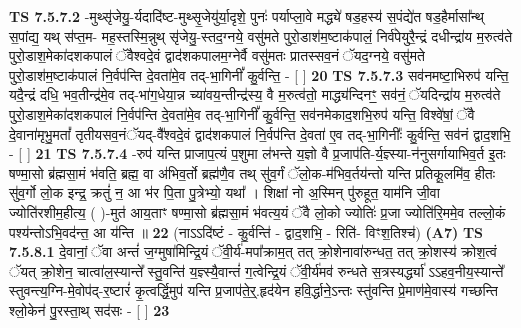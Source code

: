 \documentclass[17pt]{extarticle}
\begin{document}
                  \newline
                                \textbf{ TS 7.5.7.2} \newline
                  -मुथ्सृ॑जेयु॒-र्यदादि॑ष्ट-मुथ्सृ॒जेयु॑र्या॒दृशे॒ पुनः॑ पर्याप्ला॒वे मद्ध्ये॑ षड॒हस्य॑ स॒पंद्ये॑त षड॒हैर्मासा᳚न्थ् स॒पांद्य॒ यथ् स॑प्त॒म- मह॒स्तस्मि॒न्नुथ् सृ॑जेयु॒-स्तद॒ग्नये॒ वसु॑मते पुरो॒डाश॑म॒ष्टाक॑पालं॒ निर्व॑पेयुरै॒न्द्रं दधीन्द्रा॑य म॒रुत्व॑ते पुरो॒डाश॒मेका॑दशकपालं ॅवैश्वदे॒वं द्वाद॑शकपालम॒ग्नेर्वै वसु॑मतः प्रातस्सव॒नं ॅयद॒ग्नये॒ वसु॑मते पुरो॒डाश॑म॒ष्टाक॑पालं नि॒र्वप॑न्ति दे॒वता॑मे॒व तद्-भा॒गिनीं᳚ कु॒र्वन्ति॒ - [  ] \textbf{  20} \newline
                  \newline
                                \textbf{ TS 7.5.7.3} \newline
                  सव॑नमष्टा॒भिरुप॑ यन्ति॒ यदै॒न्द्रं दधि॒ भव॒तीन्द्र॑मे॒व तद्-भा॑ग॒धेया॒न्न च्या॑वय॒न्तीन्द्र॑स्य॒ वै म॒रुत्व॑तो॒ माद्ध्य॑न्दिनꣳ॒॒ सव॑नं॒ ॅयदिन्द्रा॑य म॒रुत्व॑ते पुरो॒डाश॒मेका॑दशकपालं नि॒र्वप॑न्ति दे॒वता॑मे॒व तद्-भा॒गिनीं᳚ कु॒र्वन्ति॒ सव॑नमेकाद॒शभि॒रुप॑ यन्ति॒ विश्वे॑षां॒ ॅवै दे॒वाना॑मृभु॒मतां᳚ तृतीयसव॒नंॅयद्-वै᳚श्वदे॒वं द्वाद॑शकपालं नि॒र्वप॑न्ति दे॒वता॑ ए॒व तद्-भा॒गिनीः᳚ कु॒र्वन्ति॒ सव॑नं द्वाद॒शभि॒ - [  ] \textbf{  21} \newline
                  \newline
                                \textbf{ TS 7.5.7.4} \newline
                  -रुप॑ यन्ति प्राजाप॒त्यं प॒शुमा ल॑भन्ते य॒ज्ञो वै प्र॒जाप॑ति-र्य॒ज्ञ्स्या-न॑नुसर्गायाभिव॒र्त इ॒तः षण्मा॒सो ब्र॑ह्मसा॒मं भ॑वति॒ ब्रह्म॒ वा अ॑भिव॒र्तो ब्रह्म॑णै॒व तथ् सु॑व॒र्गं ॅलो॒क-म॑भिव॒र्तय॑न्तो यन्ति प्रतिकू॒लमि॑व॒ हीतः सु॑व॒र्गो लो॒क इन्द्र॒ क्रतुं॑ न॒ आ भ॑र पि॒ता पु॒त्रेभ्यो॒ यथा᳚ । शिक्षा॑ नो अ॒स्मिन् पु॑रुहूत॒ याम॑नि जी॒वा ज्योति॑रशीम॒हीत्य॒ ( )-मुत॑ आय॒ताꣳ षण्मा॒सो ब्र॑ह्मसा॒मं भ॑वत्य॒यं ॅवै लो॒को ज्योतिः॑ प्र॒जा ज्योति॑रि॒ममे॒व तल्लो॒कं पश्य॑न्तोऽभि॒वद॑न्त॒ आ य॑न्ति ॥ \textbf{  22} \newline
                  \newline
                      (नाऽऽदि॑ष्टं - कु॒र्वन्ति॑ - द्वाद॒शभि॒ - रिति॑- विꣳश॒तिश्च॑)  \textbf{(A7)} \newline \newline
                                        \textbf{ TS 7.5.8.1} \newline
                  दे॒वानां॒ ॅवा अन्तं॑ ज॒ग्मुषा॑मिन्द्रि॒यं ॅवी॒र्य॑-मपा᳚क्राम॒त् तत् क्रो॒शेनावा॑रुन्धत॒ तत् क्रो॒शस्य॑ क्रोश॒त्वं ॅयत् क्रो॒शेन॒ चात्वा॑ल॒स्यान्ते᳚ स्तु॒वन्ति॑ य॒ज्ञ्स्यै॒वान्तं॑ ग॒त्वेन्द्रि॒यं ॅवी॒र्य॑मव॑ रुन्धते स॒त्रस्यर्द्ध्या॑ ऽऽहव॒नीय॒स्यान्ते᳚ स्तुवन्त्य॒ग्नि-मे॒वोप॑द्-र॒ष्टारं॑ कृ॒त्वर्द्धि॒मुप॑ यन्ति प्र॒जाप॑ते॒र्॒.हृद॑येन हवि॒र्द्धाने॒ऽन्तः स्तु॑वन्ति प्रे॒माण॑मे॒वास्य॑ गच्छन्ति श्लो॒केन॑ पु॒रस्ता॒थ् सद॑सः - [  ] \textbf{  23} \newline
\end{document}

